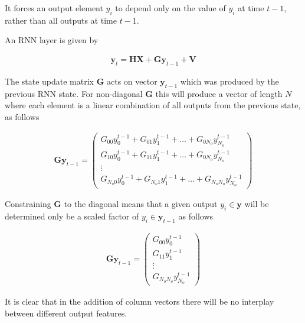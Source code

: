 \documentclass[11pt]{article}
\begin{document}
\begin{solution}
	It forces an output element $y_i$ to depend only on the value of $y_i$ at
	time $t-1$, rather than all outputs at time $t-1$.
	\newline

	An RNN layer is given by

	\begin{align}
		\boldsymbol{y}_t = \boldsymbol{H}\boldsymbol{X} +
		\boldsymbol{G}\boldsymbol{y}_{t-1} + \boldsymbol{V}
	\end{align}

	The state update matrix $\boldsymbol{G}$ acts on vector
	$\boldsymbol{y}_{t-1}$ which was produced by the previous RNN state. For
	non-diagonal $\boldsymbol{G}$ this will produce a vector of length $N$
	where each element is a linear combination of all outputs from the previous
	state, as follows

	\begin{align}
		\boldsymbol{G}\boldsymbol{y}_{t-1} =
		\begin{pmatrix}
			G_{00}y^{t-1}_{0} + G_{01}y^{t-1}_{1} + \dots +
			G_{0 N_o}y^{t-1}_{N_o}
			\\
			G_{10}y^{t-1}_{0} + G_{11}y^{t-1}_{1} + \dots +
			G_{0 N_o}y^{t-1}_{N_o}
			\\
			\vdots
			\\
			G_{N_o 0}y^{t-1}_{0} + G_{N_o 1}y^{t-1}_{1} + \dots +
			G_{N_o N_o}y^{t-1}_{N_o}
		\end{pmatrix}
	\end{align}


	Constraining $\boldsymbol{G}$ to the diagonal means that a given output
	$y_i \in \boldsymbol{y}$ will be determined only be a scaled factor of $y_i
	\in \boldsymbol{y}_{t-1}$ as follows

	\begin{align}
		\boldsymbol{G}\boldsymbol{y}_{t-1} =
		\begin{pmatrix}
			G_{00}y^{t-1}_{0}
			\\
			G_{11}y^{t-1}_{1}
			\\
			\vdots
			\\
			G_{N_o N_o}y^{t-1}_{N_o}
		\end{pmatrix}
	\end{align}

	It is clear that in the addition of column vectors there will be no
	interplay between different output features.
\end{solution}
\end{document}
